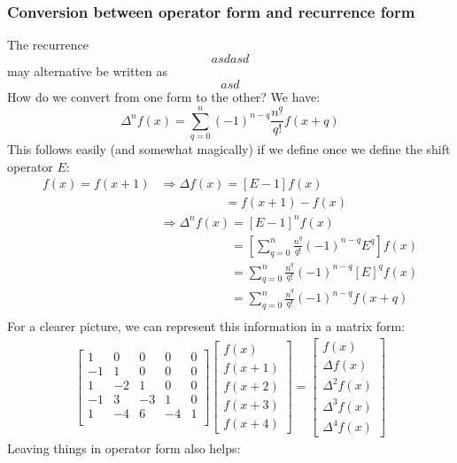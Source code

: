 \documentclass{article}
\renewcommand\({\left(}
\renewcommand\){\right)}
\begin{document}
\subsubsection{Conversion between operator form and recurrence form}
The recurrence
\[asdasd\]
may alternative be written as
\[asd\]
How do we convert from one form to the other? We have:
\[\Delta^n f(x)=\sum_{q=0}^n(-1)^{n-q}\frac{n^{\underline{q}}}{q!}f(x+q)\]
This follows easily (and somewhat magically) if we define once we define the shift operator $E$:
\begin{align*}
    [E]f(x)=f(x+1)&\Rightarrow\Delta f(x)=[E-1] f(x)\\
    &\phantom{\Rightarrow\Delta f(x)}=f(x+1)-f(x)\\
    &\Rightarrow\Delta^n f(x)=[E-1]^n f(x)\\
    &\phantom{\Rightarrow\Delta^n f(x)}=\left[\sum_{q=0}^n\frac{n^{\underline{q}}}{q!}(-1)^{n-q}E^q\right] f(x)\\
    &\phantom{\Rightarrow\Delta^n f(x)}=\sum_{q=0}^n\frac{n^{\underline{q}}}{q!}(-1)^{n-q}[E]^q f(x)\\
    &\phantom{\Rightarrow\Delta^n f(x)}=\sum_{q=0}^n\frac{n^{\underline{q}}}{q!}(-1)^{n-q} f(x+q)\\
\end{align*}
For a clearer picture, we can represent this information in a matrix form:
\begin{align*}
    \begin{bmatrix}
 1 & 0 & 0 & 0 & 0 \\
 -1 & 1 & 0 & 0 & 0 \\
 1 & -2 & 1 & 0 & 0 \\
 -1 & 3 & -3 & 1 & 0 \\
 1 & -4 & 6 & -4 & 1 \\
    \end{bmatrix}
    \begin{bmatrix}f(x)\\f(x+1)\\f(x+2)\\f(x+3)\\f(x+4)\end{bmatrix}
    =\begin{bmatrix}f(x)\\\Delta f(x)\\\Delta^2 f(x)\\\Delta^3 f(x)\\\Delta^4 f(x)\end{bmatrix}
\end{align*}
Leaving things in operator form also helps:
\end{document}
